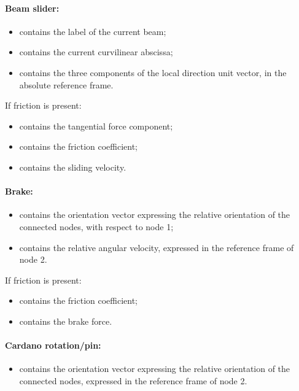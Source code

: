 \paragraph{Beam slider:}
\begin{itemize}
\item {} contains the label of the current beam;
\item {} contains the current curvilinear abscissa;
\item {} contains the three components of the local direction unit vector, in the absolute reference frame.
\end{itemize}
If friction is present:
\begin{itemize}
\item {} contains the tangential force component;
\item {} contains the friction coefficient;
\item {} contains the sliding velocity.
\end{itemize}

\paragraph{Brake:}
\begin{itemize}
\item {} contains the orientation vector 
  expressing the relative orientation of the connected nodes, with respect to node 1;
\item {} contains the relative angular
  velocity, expressed in the reference frame of node 2.
\end{itemize}
If friction is present:
\begin{itemize}
\item {} contains the friction coefficient;
\item {} contains the brake force.
\end{itemize}

\paragraph{Cardano rotation/pin:}
\begin{itemize}
\item {} contains the orientation vector
  expressing the relative orientation of the connected nodes, expressed in 
  the reference frame of node 2.
\end{itemize}

